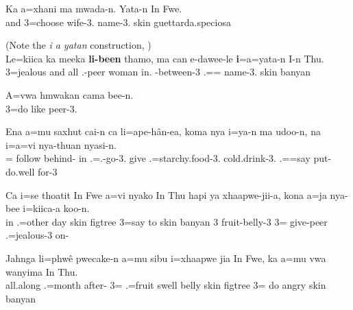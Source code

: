 \ea
\gll Ka a=xhani ma mwada-n. Yata-n In Fwe.\\ 
and 3=choose  wife-3. name-3. skin guettarda.speciosa\\ 
\glt {}
\z

\ea
({Note the \textit{i a yatan} construction, })\\
\gll Le=kiica ka meeka \textbf{li-been} thamo, ma can e-dawee-le \textbf{i}=a=yata-n I-n Thu.\\ 
3=jealous and all .-peer woman  in. -between-3 .== name-3. skin banyan\\ 
\glt {}
\z

\ea
\gll A=vwa hmwakan cama bee-n.\\ 
3=do like  peer-3.\\ 
\glt  {}
\z

\ea
\gll Ena a=mu saxhut cai-n ca li=ape-hân-ea, koma nya i=ya-n ma udoo-n, na i=a=vi nya-thuan nyasi-n.\\ 
 = follow behind- in .=.-go-3.  give .=starchy.food-3.  cold.drink-3.  .==say put-do.well for-3\\ 
\glt {}
\z 

\ea
\gll Ca i=se thoatit In Fwe a=vi nyako In Thu hapi ya xhaapwe-jii-a, kona a=ja nya-bee i=kiica-a koo-n.\\ 
in .=other day skin figtree 3=say to skin banyan  3 fruit-belly-3  3= give-peer .=jealous-3 on-\\ 
\glt {}
\z

\ea
\gll Jahnga li=phwê pwecake-n a=mu sibu i=xhaapwe jia In Fwe, ka a=mu vwa wanyima In Thu.\\ 
all.along .=month after- 3= .=fruit swell belly skin figtree  3= do angry skin banyan\\ 
\glt  {}
\z

